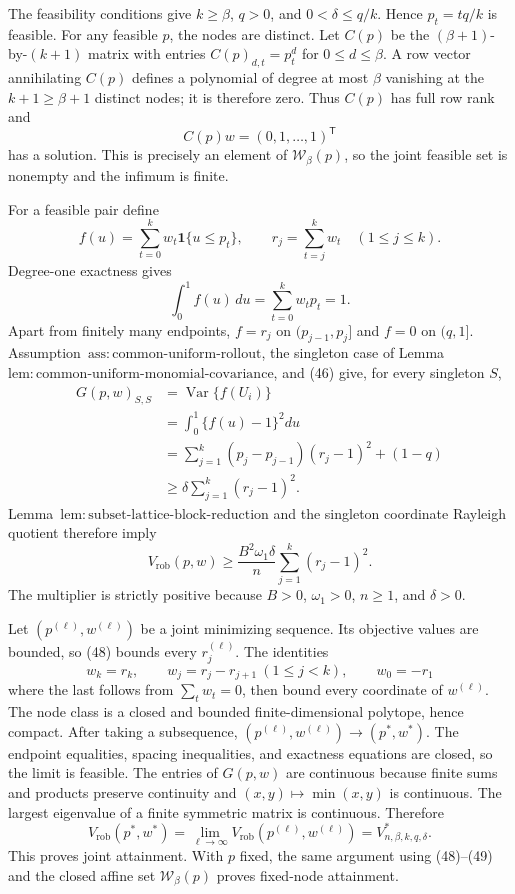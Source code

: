 The feasibility conditions give \(k\ge\beta\), \(q>0\), and \(0<\delta\le q/k\).  Hence \(p_t=tq/k\) is feasible.  For any feasible \(p\), the nodes are distinct.  Let \(C(p)\) be the \((\beta+1)\)-by-\((k+1)\) matrix with entries \(C(p)_{d,t}=p_t^d\) for \(0\le d\le\beta\).  A row vector annihilating \(C(p)\) defines a polynomial of degree at most \(\beta\) vanishing at the \(k+1\ge\beta+1\) distinct nodes; it is therefore zero.  Thus \(C(p)\) has full row rank and
\[
C(p)w=(0,1,\ldots,1)^{\mathsf T}
\]
has a solution.  This is precisely an element of \(\mathcal W_\beta(p)\), so the joint feasible set is nonempty and the infimum is finite.

For a feasible pair define
\[
f(u)=\sum_{t=0}^kw_t\mathbf 1\{u\le p_t\},
\qquad
r_j=\sum_{t=j}^kw_t\quad(1\le j\le k).
\]
Degree-one exactness gives
\[
\int_0^1f(u)\,du=\sum_{t=0}^kw_tp_t=1.
\tag{46}
\]
Apart from finitely many endpoints, \(f=r_j\) on \((p_{j-1},p_j]\) and \(f=0\) on \((q,1]\).  Assumption~\(\mathrm{ass{:}common\text{-}uniform\text{-}rollout}\), the singleton case of Lemma~\(\mathrm{lem{:}common\text{-}uniform\text{-}monomial\text{-}covariance}\), and (46) give, for every singleton \(S\),
\[
\begin{aligned}
G(p,w)_{S,S}
&=\operatorname{Var}\{f(U_i)\}\\
&=\int_0^1\{f(u)-1\}^2du\\
&=\sum_{j=1}^k(p_j-p_{j-1})(r_j-1)^2+(1-q)\\
&\ge\delta\sum_{j=1}^k(r_j-1)^2.
\end{aligned}
\tag{47}
\]
Lemma~\(\mathrm{lem{:}subset\text{-}lattice\text{-}block\text{-}reduction}\) and the singleton coordinate Rayleigh quotient therefore imply
\[
V_{\mathrm{rob}}(p,w)
\ge\frac{B^2\omega_1\delta}{n}
\sum_{j=1}^k(r_j-1)^2.
\tag{48}
\]
The multiplier is strictly positive because \(B>0\), \(\omega_1>0\), \(n\ge1\), and \(\delta>0\).

Let \((p^{(\ell)},w^{(\ell)})\) be a joint minimizing sequence.  Its objective values are bounded, so (48) bounds every \(r_j^{(\ell)}\).  The identities
\[
w_k=r_k,
\qquad
w_j=r_j-r_{j+1}\ (1\le j<k),
\qquad
w_0=-r_1
\tag{49}
\]
where the last follows from \(\sum_tw_t=0\), then bound every coordinate of \(w^{(\ell)}\).  The node class is a closed and bounded finite-dimensional polytope, hence compact.  After taking a subsequence, \((p^{(\ell)},w^{(\ell)})\to(p^*,w^*)\).  The endpoint equalities, spacing inequalities, and exactness equations are closed, so the limit is feasible.  The entries of \(G(p,w)\) are continuous because finite sums and products preserve continuity and \((x,y)\mapsto\min(x,y)\) is continuous.  The largest eigenvalue of a finite symmetric matrix is continuous.  Therefore
\[
V_{\mathrm{rob}}(p^*,w^*)
=\lim_{\ell\to\infty}V_{\mathrm{rob}}(p^{(\ell)},w^{(\ell)})
=V^*_{n,\beta,k,q,\delta}.
\]
This proves joint attainment.  With \(p\) fixed, the same argument using (48)--(49) and the closed affine set \(\mathcal W_\beta(p)\) proves fixed-node attainment.